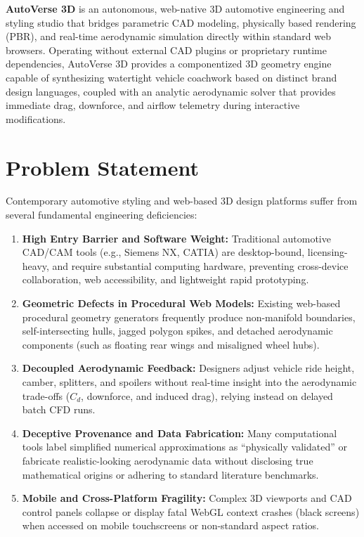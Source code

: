\documentclass[12pt,a4paper]{report}
\begin{document}
\textbf{AutoVerse 3D} is an autonomous, web-native 3D automotive engineering and styling studio that bridges parametric CAD modeling, physically based rendering (PBR), and real-time aerodynamic simulation directly within standard web browsers. Operating without external CAD plugins or proprietary runtime dependencies, AutoVerse 3D provides a componentized 3D geometry engine capable of synthesizing watertight vehicle coachwork based on distinct brand design languages, coupled with an analytic aerodynamic solver that provides immediate drag, downforce, and airflow telemetry during interactive modifications.

\section{Problem Statement}
Contemporary automotive styling and web-based 3D design platforms suffer from several fundamental engineering deficiencies:
\begin{enumerate}
    \item \textbf{High Entry Barrier and Software Weight:} Traditional automotive CAD/CAM tools (e.g., Siemens NX, CATIA) are desktop-bound, licensing-heavy, and require substantial computing hardware, preventing cross-device collaboration, web accessibility, and lightweight rapid prototyping.
    \item \textbf{Geometric Defects in Procedural Web Models:} Existing web-based procedural geometry generators frequently produce non-manifold boundaries, self-intersecting hulls, jagged polygon spikes, and detached aerodynamic components (such as floating rear wings and misaligned wheel hubs).
    \item \textbf{Decoupled Aerodynamic Feedback:} Designers adjust vehicle ride height, camber, splitters, and spoilers without real-time insight into the aerodynamic trade-offs ($C_d$, downforce, and induced drag), relying instead on delayed batch CFD runs.
    \item \textbf{Deceptive Provenance and Data Fabrication:} Many computational tools label simplified numerical approximations as ``physically validated'' or fabricate realistic-looking aerodynamic data without disclosing true mathematical origins or adhering to standard literature benchmarks.
    \item \textbf{Mobile and Cross-Platform Fragility:} Complex 3D viewports and CAD control panels collapse or display fatal WebGL context crashes (black screens) when accessed on mobile touchscreens or non-standard aspect ratios.
\end{enumerate}
\end{document}
